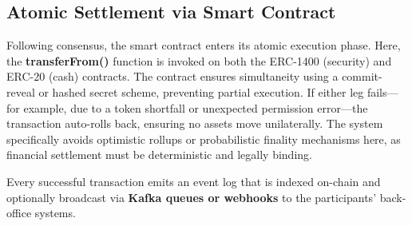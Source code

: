 \documentclass[conference]{IEEEtran}
\begin{document}
\subsection{Atomic Settlement via Smart Contract}
Following consensus, the smart contract enters its atomic execution phase. Here, the \textbf{transferFrom()} function is invoked on both the ERC-1400 (security) and ERC-20 (cash) contracts. The contract ensures simultaneity using a commit-reveal or hashed secret scheme, preventing partial execution.
If either leg fails—for example, due to a token shortfall or unexpected permission error—the transaction auto-rolls back, ensuring no assets move unilaterally. The system specifically avoids optimistic rollups or probabilistic finality mechanisms here, as financial settlement must be deterministic and legally binding.

Every successful transaction emits an event log that is indexed on-chain and optionally broadcast via \textbf{Kafka queues or webhooks} to the participants' back-office systems.
\end{document}

